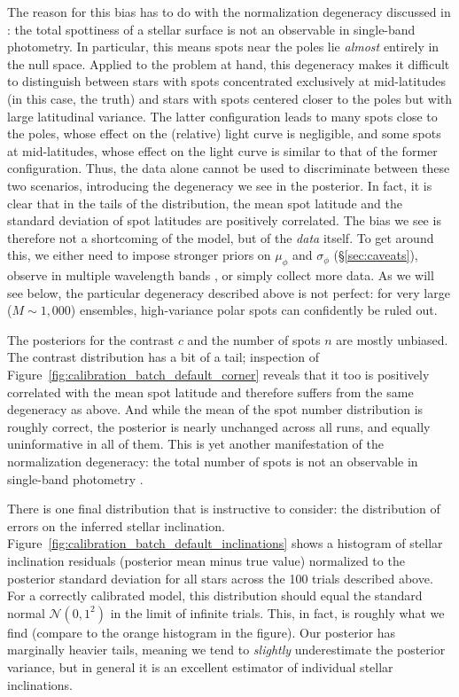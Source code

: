\documentclass[modern,linenumbers]{aastex62}
\begin{document}
The reason for this bias has to do with the normalization degeneracy discussed in
:
the total spottiness of a stellar surface is not an observable in single-band
photometry. In particular, this means spots near the poles lie \emph{almost}
entirely in the null space. Applied to the problem at hand, this degeneracy
makes it difficult to distinguish between stars with spots concentrated
exclusively at mid-latitudes (in this case, the truth) and
stars with spots centered closer to the poles but with large latitudinal
variance. The latter configuration leads to many spots close to the poles,
whose effect on the (relative) light curve is negligible, and some spots
at mid-latitudes, whose effect on the light curve is similar to that of
the former configuration.
Thus, the data alone cannot be used to discriminate between these two
scenarios, introducing the degeneracy we see in the posterior. In fact,
it is clear that in the tails of the distribution, the mean spot latitude
and the standard deviation of spot latitudes are positively correlated.
The bias we see is therefore not a shortcoming of the model, but of the
\emph{data} itself. To get around this, we either need to impose stronger
priors on $\mu_\phi$ and $\sigma_\phi$ (\S\ref{sec:caveats}),
observe in multiple wavelength bands
, or simply collect more data.
As we will see below, the particular degeneracy described above is not perfect:
for very large ($M \sim 1{,}000$) ensembles, high-variance polar spots
can confidently be ruled out.

The posteriors for the contrast $c$ and the number of spots $n$
are mostly unbiased.
The contrast distribution has a bit of
a tail; inspection of Figure~\ref{fig:calibration_batch_default_corner}
reveals that it too is positively correlated with the mean spot latitude
and therefore suffers from the same degeneracy as above. And while the
mean of the spot number distribution is roughly correct, the posterior
is nearly unchanged across all runs, and equally uninformative in all
of them. This is yet another manifestation of the normalization degeneracy:
the total number of spots is not an observable in single-band photometry
.

There is one final distribution that is instructive to consider: the
distribution of errors on the inferred stellar inclination.
Figure~\ref{fig:calibration_batch_default_inclinations} shows a histogram
of stellar inclination residuals (posterior mean minus true value)
normalized to the posterior standard deviation for all stars across the
100 trials described above. For a correctly calibrated model, this distribution
should equal the standard normal $\mathcal{N}(0, 1^2)$ in the limit of
infinite trials. This, in fact, is roughly what we find (compare to the
orange histogram in the figure). Our posterior has marginally
heavier tails, meaning we tend to \emph{slightly} underestimate the
posterior variance, but in general it is an excellent estimator of
individual stellar inclinations.
\end{document}
